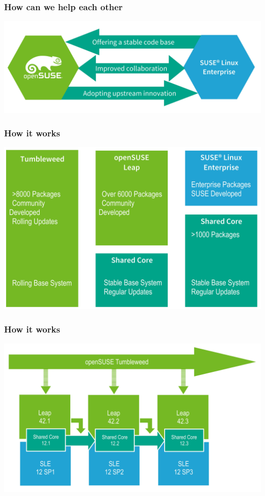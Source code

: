 \documentclass{beamer}
\begin{document}
\begin{frame}
\frametitle{How can we help each other}
\begin{center}
\includegraphics[width=.8\paperwidth]{mutual-benefits}
\end{center}
\end{frame}

\begin{frame}
\frametitle{How it works}
\begin{center}
\includegraphics[width=.8\paperwidth]{composition}
\end{center}
\end{frame}

\begin{frame}
\frametitle{How it works}
\begin{center}
\includegraphics[width=.8\paperwidth]{leap-starting}
\end{center}
\end{frame}
\end{document}
